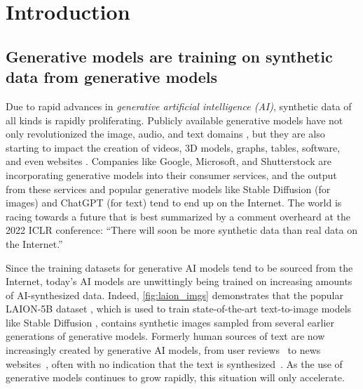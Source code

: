 \documentclass{article}
\newcommand\richb[1]{{\color{blue}\sf{[richb: #1]}}}
\newcommand\richb[1]{}
\begin{document}
\clearpage

\section{Introduction}

\subsection{Generative models are training on synthetic data from generative models}


Due to rapid advances in {\em generative artificial intelligence (AI)},  synthetic data of all kinds is rapidly proliferating. Publicly available generative models have not only revolutionized the image, audio, and text domains \cite{stable_diff, dalle2, audio_lm, music_lm, elevenai, gpt4, llama, aug_gpt}, but they are also starting to impact the creation of videos, 3D models, graphs, tables, software, and even websites \cite{dreamfusion, phenaki, digress, tabddpm, programming_is_hard, synthetic_websites}. 
Companies like Google, Microsoft, and Shutterstock are incorporating generative models into their consumer services, and the output from these services and popular generative models like Stable Diffusion \cite{stable_diff} (for images) and ChatGPT \cite{chatgpt_is_not_all_you_need} (for text) tend to end up on the Internet. The world is racing towards a future that is best summarized by a comment overheard at the 2022 ICLR conference: ``There will soon be more synthetic data than real data on the Internet.''


Since the training datasets for generative AI models tend to be sourced from the Internet, today's AI models are unwittingly being trained on increasing amounts of AI-synthesized data.
Indeed, \cref{fig:laion_imgs} demonstrates that the popular LAION-5B dataset \cite{laion}, which is used to train state-of-the-art text-to-image models like Stable Diffusion \cite{stable_diff}, contains synthetic images sampled from several earlier generations of generative models. 
Formerly human sources of text are now increasingly created by generative AI models, from user reviews~\cite{ai_spam} to news websites~\cite{synthetic_websites}, often with no indication that the text is synthesized~\cite{cnet_secret}.
As the use of generative models continues to grow rapidly, this situation will only accelerate.
\end{document}
